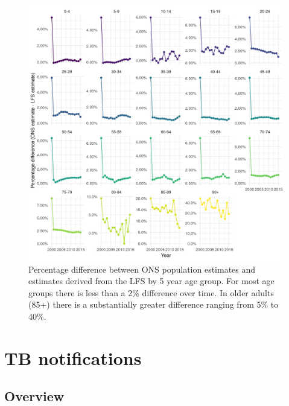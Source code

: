 \documentclass[11pt,twoside]{bristolthesis}
\begin{document}
  \begin{figure}
  
  {\centering \includegraphics[width=0.8\linewidth,]{chapters/tb-epi-england/figures/plot-age-strat} 
  
  }
  
  \caption[Percentage difference between ONS population estimates and estimates derived from the LFS by 5 year age group.]{Percentage difference between ONS population estimates and estimates derived from the LFS by 5 year age group. For most age groups there is less than a 2\% difference over time. In older adults (85+) there is a substantially greater difference ranging from 5\% to 40\%.}\label{fig:plot-age-strat}
  \end{figure}
  \hypertarget{tb-notifications-1}{%
  \section{TB notifications}\label{tb-notifications-1}}
  
  \hypertarget{overview}{%
  \subsection{Overview}\label{overview}}
  
\end{document}
